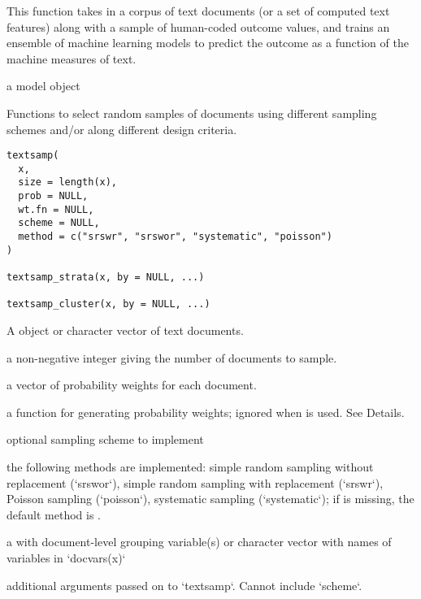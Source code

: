 \documentclass[a4paper]{book}
\begin{document}
%
\begin{Details}\relax
This function takes in a corpus of text documents (or a set of computed text
features) along with a sample of human-coded outcome values, and trains an
ensemble of machine learning models to predict the outcome as a function of
the machine measures of text.
\end{Details}
%
\begin{Value}
a  model object
\end{Value}
%
\begin{Description}\relax
Functions to select random samples of documents using different sampling schemes and/or
along different design criteria.
\end{Description}
%
\begin{Usage}
\begin{verbatim}
textsamp(
  x,
  size = length(x),
  prob = NULL,
  wt.fn = NULL,
  scheme = NULL,
  method = c("srswr", "srswor", "systematic", "poisson")
)

textsamp_strata(x, by = NULL, ...)

textsamp_cluster(x, by = NULL, ...)
\end{verbatim}
\end{Usage}
%
\begin{Arguments}
\begin{ldescription}
\item[\code{x}] A  object or character vector of text documents.

\item[\code{size}] a non-negative integer giving the number of documents to sample.

\item[\code{prob}] a vector of probability weights for each document.

\item[\code{wt.fn}] a function for generating probability weights; ignored when  is used. See Details.

\item[\code{scheme}] optional sampling scheme to implement

\item[\code{method}] the following methods are implemented: simple random sampling without replacement (`srswor`),
simple random sampling with replacement (`srswr`), Poisson sampling (`poisson`), systematic sampling (`systematic`);
if  is missing, the default method is .

\item[\code{by}] a  with document-level grouping variable(s) or character vector with names of variables in `docvars(x)`

\item[\code{...}] additional arguments passed on to `textsamp`. Cannot include `scheme`.
\end{ldescription}
\end{Arguments}
\end{document}

